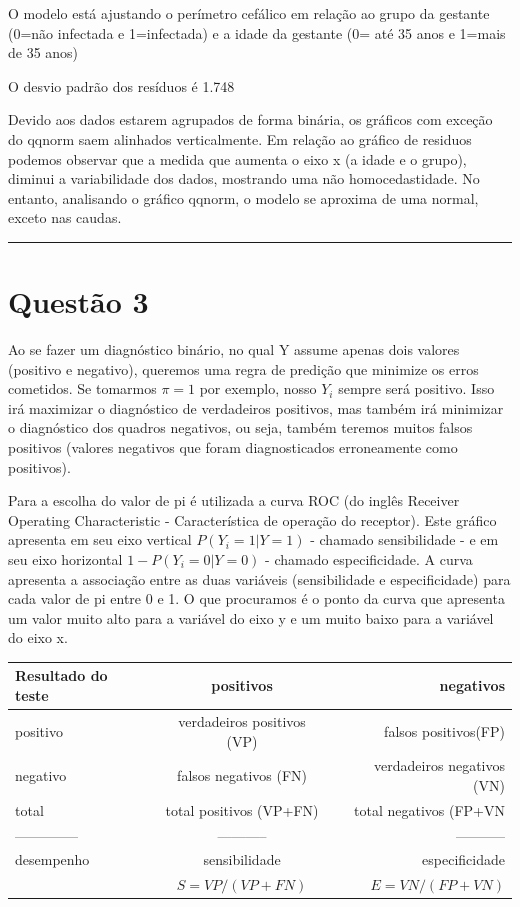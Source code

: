 \documentclass[11pt,]{article}
\begin{document}
O modelo está ajustando o perímetro cefálico em relação ao grupo da
gestante (0=não infectada e 1=infectada) e a idade da gestante (0= até
35 anos e 1=mais de 35 anos)

O desvio padrão dos resíduos é 1.748

Devido aos dados estarem agrupados de forma binária, os gráficos com
exceção do qqnorm saem alinhados verticalmente. Em relação ao gráfico de
residuos podemos observar que a medida que aumenta o eixo x (a idade e o
grupo), diminui a variabilidade dos dados, mostrando uma não
homocedastidade. No entanto, analisando o gráfico qqnorm, o modelo se
aproxima de uma normal, exceto nas caudas.

\begin{center}\rule{0.5\linewidth}{\linethickness}\end{center}

\section{Questão 3}\label{questao-3}

Ao se fazer um diagnóstico binário, no qual Y assume apenas dois valores
(positivo e negativo), queremos uma regra de predição que minimize os
erros cometidos. Se tomarmos \(\pi =1\) por exemplo, nosso \(Y_{i}\)
sempre será positivo. Isso irá maximizar o diagnóstico de verdadeiros
positivos, mas também irá minimizar o diagnóstico dos quadros negativos,
ou seja, também teremos muitos falsos positivos (valores negativos que
foram diagnosticados erroneamente como positivos).

Para a escolha do valor de pi é utilizada a curva ROC (do inglês
Receiver Operating Characteristic - Característica de operação do
receptor). Este gráfico apresenta em seu eixo vertical
\(P(Y_{i}=1|Y=1)\) - chamado sensibilidade - e em seu eixo horizontal
\(1-P(Y_{i}=0|Y=0)\) - chamado especificidade. A curva apresenta a
associação entre as duas variáveis (sensibilidade e especificidade) para
cada valor de pi entre 0 e 1. O que procuramos é o ponto da curva que
apresenta um valor muito alto para a variável do eixo y e um muito baixo
para a variável do eixo x.

\begin{longtable}[]{@{}lcr@{}}
\toprule
Resultado do teste & positivos & negativos\tabularnewline
\midrule
\endhead
positivo & verdadeiros positivos (VP) & falsos
positivos(FP)\tabularnewline
negativo & falsos negativos (FN) & verdadeiros negativos
(VN)\tabularnewline
total & total positivos (VP+FN) & total negativos (FP+VN\tabularnewline
-------------- & ----------- & -----------\tabularnewline
desempenho & sensibilidade & especificidade\tabularnewline
& \(S=VP/(VP+FN)\) & \(E=VN/(FP+VN)\)\tabularnewline
\bottomrule
\end{longtable}

\newpage
\singlespacing 

\end{document}
